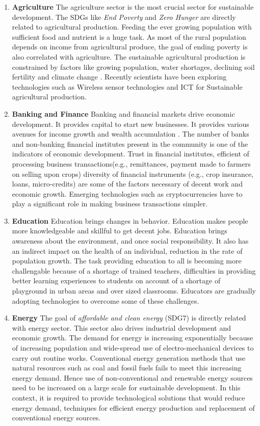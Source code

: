 \documentclass[10pt]{IETBook}
\begin{document}
\begin{enumerate}
 \item {\bf Agriculture} The agriculture sector is the most crucial  sector for sustainable development. The SDGs like {\em End Poverty} and {\em Zero Hunger} are directly related to agricultural production. Feeding the ever growing population with sufficient food and nutrient is a huge task. As most of the rural population depends on income from agricultural produce, the goal of ending poverty is also correlated with agriculture. The sustainable agricultural 
production is constrained by factors like growing population, water shortages, declining soil fertility and climate change \cite{wu2018information}. Recently scientists have been exploring technologies such as Wireless sensor technologies\cite{culibrina2015smart} and ICT\cite{singh2015innovation} for Sustainable agricultural production.
 \item {\bf Banking and Finance}
 Banking and financial markets drive economic development. It provides capital to start new businesses. It provides various avenues for income growth and wealth accumulation \cite{rioja2004finance}. The number of banks and non-banking financial institutes present in the community is one of the indicators of economic development. Trust in financial institutes, efficient of processing business transactions(e.g., remittances, payment made to farmers on selling upon crops) diversity of financial instruments (e.g., crop insurance, loans, micro-credits) are some of the factors necessary of decent work and economic growth. Emerging technologies such as cryptocurrencies have to play a significant role in making business transactions simpler. 
 \item {\bf Education} Education brings changes in behavior. Education makes people more knowledgeable and skillful to get decent jobs. Education brings awareness about the environment, and once social responsibility. It also has an indirect impact on the health of an individual, reduction in the rate of population growth. The task providing education to all is becoming more challengable because of a shortage of trained teachers, difficulties in providing better learning experiences to students on account of a shortage of playground in urban areas and over sized classrooms. Educators are gradually adopting technologies to overcome some of these challenges.
 \item {\bf Energy} The goal of {\em affordable and clean energy} (SDG7) is directly related with
 energy sector. This sector also drives industrial development and economic growth. The demand for energy is increasing exponentially because of increasing population and wide-spread use of electro-mechanical devices to carry out routine works. Conventional energy generation methods that use natural resources such as coal and fossil fuels fails to meet this increasing energy demand. Hence use of non-conventional and renewable energy sources need to be increased on a large scale for sustainable development. In this context, it is required to provide technological solutions that would reduce energy demand, techniques for efficient energy production and replacement of conventional energy sources.\cite{lund2007renewable}

\end{enumerate}
\end{document}
